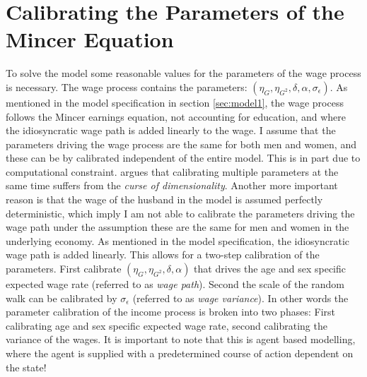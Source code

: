 \section{Calibrating the Parameters of the Mincer Equation}


To solve the model some reasonable values for the parameters of the wage process is necessary. The wage process contains the parameters: $(\eta_G, \eta_{G^2}, \delta, \alpha, \sigma_{\epsilon})$. As mentioned in the model specification in section \ref{sec:model1}, the wage process follows the Mincer earnings equation, not accounting for education, and where the idiosyncratic wage path is added linearly to the wage. I assume that the parameters driving the wage process are the same for both men and women, and these can be by calibrated independent of the entire model. This is in part due to computational constraint. \textcite{friedman_elements_2001} argues that calibrating multiple parameters at the same time suffers from the \textit{curse of dimensionality}. Another more important reason is that the wage of the husband in the model is assumed perfectly deterministic, which imply I am not able to calibrate the parameters driving the wage path under the assumption these are the same for men and women in the underlying economy. As mentioned in the model specification, the idiosyncratic wage path is added linearly. This  allows for a two-step calibration of the parameters. First calibrate $(\eta_G, \eta_{G^2}, \delta, \alpha)$ that drives the age and sex specific expected wage rate (referred to as \textit{wage path}). Second the scale of the random walk can be calibrated by $\sigma_\epsilon$ (referred to as \textit{wage variance}). In other words the parameter calibration of the income process is broken into two phases: First calibrating age and sex specific expected wage rate, second calibrating the variance of the wages. It is important to note that this is agent based modelling, where the agent is supplied with a predetermined course of action dependent on the state! 

